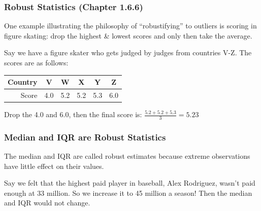 \documentclass[handout]{beamer}
\newcommand{\blue}[1]{\textcolor{blue2}{#1}}
\begin{document}
\begin{frame}
\frametitle{Robust Statistics (Chapter 1.6.6)}
One example illustrating the philosophy of ``robustifying'' to outliers is scoring in figure skating: \blue{drop the highest \& lowest scores} and only then take the average.  

\vspace{0.5cm}

\pause Say we have a figure skater who gets judged by judges from countries V-Z. The scores are as follows:
\begin{center}
\begin{tabular}{r||ccccc}
\hline
Country & V & W & X & Y & Z \\ 
\hline
Score & 4.0 & 5.2 & 5.2 & 5.3 & 6.0 \\ 
\hline
\end{tabular}
\end{center}

\vspace{0.5cm}

\pause Drop the 4.0 and 6.0, then the final score is: $\frac{5.2 + 5.2 + 5.3}{3} = 5.23$
\end{frame}



\begin{frame}
\frametitle{Median and IQR are Robust Statistics}

The median and IQR are called robust estimates because extreme observations have
little effect on their values.

\vspace{0.5cm}

\pause Say we felt that the highest paid player in baseball, Alex Rodriguez, wasn't \blue{paid enough} at 33 million.  So we increase it to 45 million a season!  Then the median and IQR would not change.  


\end{frame}
\end{document}

